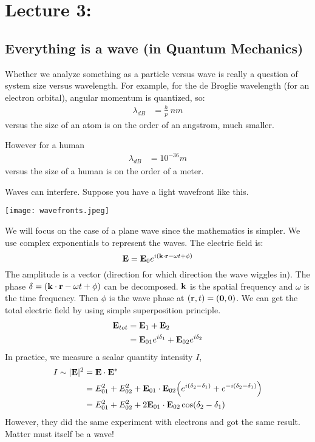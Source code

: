 \section{Lecture 3: }

\subsection{Everything is a wave (in Quantum Mechanics)}

Whether we analyze something as a particle versus wave is really a question of system size versus wavelength.
For example, for the de Broglie wavelength (for an electron orbital), angular momentum is quantized, so:
\begin{align*}
    \lambda_{dB} &= \frac{h}{p} ~ nm
\end{align*}
versus the size of an atom is on the order of an angstrom, much smaller.

However for a human
\begin{align*}
    \lambda_{dB} &= 10^{-36} m
\end{align*}
versus the size of a human is on the order of a meter.

Waves can interfere. Suppose you have a light wavefront like this.

\texttt{[image: wavefronts.jpeg]}

We will focus on the case of a plane wave since the mathematics is simpler. We use complex exponentials to represent the waves. The electric field is:
\[ \mathbf{E} = \mathbf{E}_0  e^{i(\mathbf{k} \cdot \mathbf{r} - \omega t + \phi)} \]
The amplitude is a vector (direction for which direction the wave wiggles in). The phase $\delta = (\mathbf{k} \cdot \mathbf{r} - \omega t + \phi)$ can be decomposed.
$\mathbf{k}$ is the spatial frequency and $\omega$ is the time frequency. Then $\phi$ is the wave phase at $(\mathbf{r}, t) = (\mathbf{0}, 0)$.
We can get the total electric field by using simple superposition principle.
\begin{align*}
    \mathbf{E}_{tot} &= \mathbf{E}_1 + \mathbf{E}_2 \\
    &= \mathbf{E}_{01} e^{i \delta_1} + \mathbf{E}_{02} e^{i \delta_2}
\end{align*}
In practice, we measure a scalar quantity intensity $I$,
\begin{align*}
    I \sim |\mathbf{E}|^2 &= \mathbf{E} \cdot \mathbf{E}^* \\
    &= E_{01}^2 + E_{02}^2 + \mathbf{E}_{01} \cdot \mathbf{E}_{02} \qty(e^{i (\delta_2 - \delta_1)} + e^{-i(\delta_2 - \delta_1)}) \\
    &= E_{01}^2 + E_{02}^2 + 2 \mathbf{E}_{01} \cdot \mathbf{E}_{02} \cos(\delta_2 - \delta_1)
\end{align*}
However, they did the same experiment with electrons and got the same result. Matter must itself be a wave!

